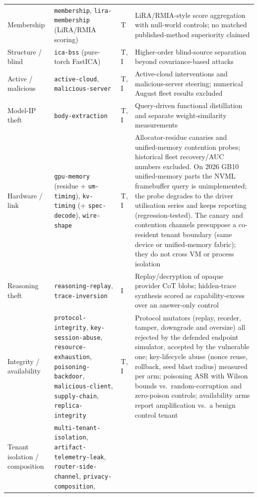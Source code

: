 \documentclass[11pt]{article}
\newcommand{\attack}[1]{\nolinkurl{#1}}
\begin{document}
{\begin{longtable}{@{}p{2.9cm}p{4.1cm}p{1.1cm}p{5.6cm}@{}}
\addlinespace[2pt]
Membership &
\attack{membership}, \attack{lira-membership} (LiRA/RMIA scoring) &
T &
LiRA/RMIA-style score aggregation with null-world controls; no matched published-method superiority claimed \\
\addlinespace[2pt]
Structure / blind &
\attack{ica-bss} (pure-torch FastICA) &
T, I &
Higher-order blind-source separation beyond covariance-based attacks \\
\addlinespace[2pt]
Active / malicious &
\attack{active-cloud}, \attack{malicious-server} &
T, I &
Active-cloud interventions and malicious-server steering; numerical August fleet results excluded \\
\addlinespace[2pt]
Model-IP theft &
\attack{body-extraction} &
T, I &
Query-driven functional distillation and separate weight-similarity measurements \\
\addlinespace[2pt]
Hardware / link &
\attack{gpu-memory} (residue + \texttt{um-timing}), \attack{kv-timing}
(+ \texttt{spec-decode}), \attack{wire-shape} &
T, I &
Allocator-residue canaries and unified-memory contention probes; historical fleet recovery/AUC numbers excluded. On 2026 GB10 unified-memory parts the NVML
framebuffer query is unimplemented; the probe degrades to the driver
utilisation series and keeps reporting (regression-tested). The canary
and contention channels presuppose a co-resident tenant boundary (same
device or unified-memory fabric); they do not cross VM or process
isolation \\
\addlinespace[2pt]
Reasoning theft &
\attack{reasoning-replay}, \attack{trace-inversion} &
I &
Replay/decryption of opaque provider CoT blobs; hidden-trace synthesis
scored as capability-excess over an answer-only control \\
\addlinespace[2pt]
Integrity / availability &
\attack{protocol-integrity}, \attack{key-session-abuse},
\attack{resource-exhaustion}, \attack{poisoning-backdoor},
\attack{malicious-client}, \attack{supply-chain}, \attack{replica-integrity} &
T, I &
Protocol mutators (replay, reorder, tamper, downgrade and oversize) all rejected
by the defended endpoint simulator, accepted by the vulnerable one;
key-lifecycle abuse (nonce reuse, rollback, seed blast radius) measured
per arm; poisoning ASR with Wilson bounds vs.\ random-corruption and
zero-poison controls; availability arms report amplification vs.\ a
benign control tenant \\
\addlinespace[2pt]
Tenant isolation / composition &
\attack{multi-tenant-isolation}, \attack{artifact-telemetry-leak},
\attack{router-side-channel}, \attack{privacy-composition},

\end{longtable}}
\end{document}
